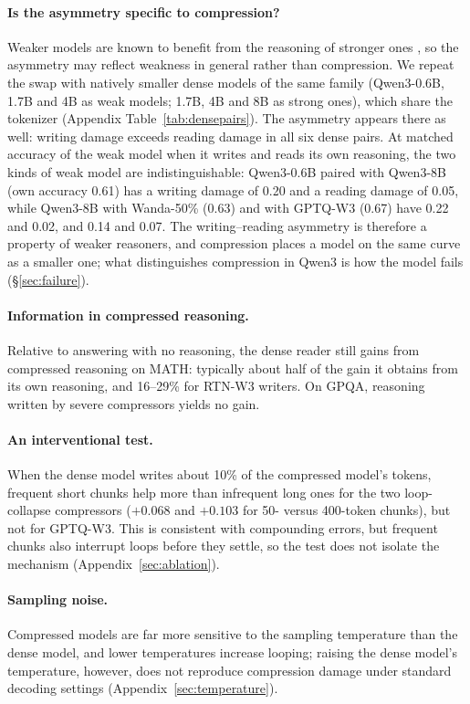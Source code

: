 \documentclass[10pt]{article}
\begin{document}
\paragraph{Is the asymmetry specific to compression?}
Weaker models are known to benefit from the reasoning of stronger ones \citep{cheng2026travels}, so the asymmetry may reflect weakness in general rather than compression. We repeat the swap with natively smaller dense models of the same family (Qwen3-0.6B, 1.7B and 4B as weak models; 1.7B, 4B and 8B as strong ones), which share the tokenizer (Appendix Table~\ref{tab:densepairs}). The asymmetry appears there as well: writing damage exceeds reading damage in all six dense pairs. At matched accuracy of the weak model when it writes and reads its own reasoning, the two kinds of weak model are indistinguishable: Qwen3-0.6B paired with Qwen3-8B (own accuracy 0.61) has a writing damage of 0.20 and a reading damage of 0.05, while Qwen3-8B with Wanda-50\% (0.63) and with GPTQ-W3 (0.67) have 0.22 and 0.02, and 0.14 and 0.07. The writing--reading asymmetry is therefore a property of weaker reasoners, and compression places a model on the same curve as a smaller one; what distinguishes compression in Qwen3 is how the model fails (\S\ref{sec:failure}).

\paragraph{Information in compressed reasoning.}
Relative to answering with no reasoning, the dense reader still gains from compressed reasoning on MATH: typically about half of the gain it obtains from its own reasoning, and 16--29\% for RTN-W3 writers. On GPQA, reasoning written by severe compressors yields no gain.

\paragraph{An interventional test.}
When the dense model writes about 10\% of the compressed model's tokens, frequent short chunks help more than infrequent long ones for the two loop-collapse compressors ($+0.068$ and $+0.103$ for 50- versus 400-token chunks), but not for GPTQ-W3. This is consistent with compounding errors, but frequent chunks also interrupt loops before they settle, so the test does not isolate the mechanism (Appendix~\ref{sec:ablation}).

\paragraph{Sampling noise.}
Compressed models are far more sensitive to the sampling temperature than the dense model, and lower temperatures increase looping; raising the dense model's temperature, however, does not reproduce compression damage under standard decoding settings (Appendix~\ref{sec:temperature}).
\end{document}
